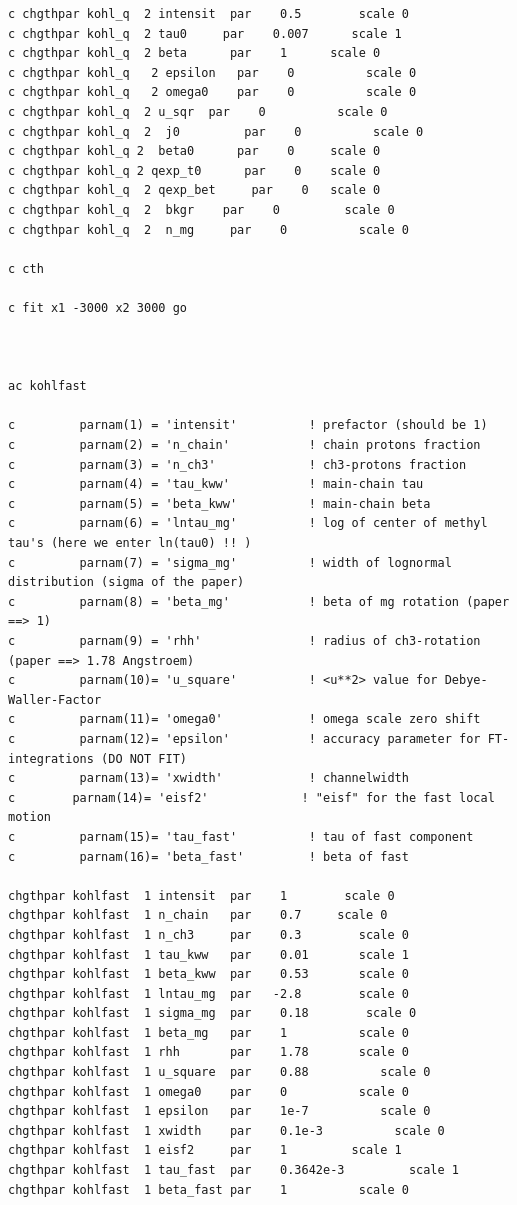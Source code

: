 \documentclass[11pt,fleqn]{book} %
\begin{document}
\begin{verbatim}
c chgthpar kohl_q  2 intensit  par    0.5        scale 0  
c chgthpar kohl_q  2 tau0     par    0.007      scale 1
c chgthpar kohl_q  2 beta      par    1 	 scale 0
c chgthpar kohl_q   2 epsilon   par    0          scale 0
c chgthpar kohl_q   2 omega0    par    0          scale 0
c chgthpar kohl_q  2 u_sqr  par    0          scale 0
c chgthpar kohl_q  2  j0         par    0          scale 0
c chgthpar kohl_q 2  beta0      par    0 	 scale 0
c chgthpar kohl_q 2 qexp_t0      par    0 	 scale 0
c chgthpar kohl_q  2 qexp_bet     par    0 	 scale 0
c chgthpar kohl_q  2  bkgr    par    0         scale 0
c chgthpar kohl_q  2  n_mg     par    0          scale 0

c cth

c fit x1 -3000 x2 3000 go



ac kohlfast

c         parnam(1) = 'intensit'          ! prefactor (should be 1)
c         parnam(2) = 'n_chain'           ! chain protons fraction
c         parnam(3) = 'n_ch3'             ! ch3-protons fraction
c         parnam(4) = 'tau_kww'           ! main-chain tau
c         parnam(5) = 'beta_kww'          ! main-chain beta
c         parnam(6) = 'lntau_mg'          ! log of center of methyl tau's (here we enter ln(tau0) !! )
c         parnam(7) = 'sigma_mg'          ! width of lognormal distribution (sigma of the paper)
c         parnam(8) = 'beta_mg'           ! beta of mg rotation (paper ==> 1)
c         parnam(9) = 'rhh'               ! radius of ch3-rotation (paper ==> 1.78 Angstroem)
c         parnam(10)= 'u_square'          ! <u**2> value for Debye-Waller-Factor
c         parnam(11)= 'omega0'            ! omega scale zero shift
c         parnam(12)= 'epsilon'           ! accuracy parameter for FT-integrations (DO NOT FIT)
c         parnam(13)= 'xwidth'            ! channelwidth
c        parnam(14)= 'eisf2'             ! "eisf" for the fast local motion
c         parnam(15)= 'tau_fast'          ! tau of fast component
c         parnam(16)= 'beta_fast'         ! beta of fast 

chgthpar kohlfast  1 intensit  par    1        scale 0      
chgthpar kohlfast  1 n_chain   par    0.7     scale 0
chgthpar kohlfast  1 n_ch3     par    0.3        scale 0
chgthpar kohlfast  1 tau_kww   par    0.01       scale 1 
chgthpar kohlfast  1 beta_kww  par    0.53 	     scale 0
chgthpar kohlfast  1 lntau_mg  par   -2.8	     scale 0
chgthpar kohlfast  1 sigma_mg  par    0.18        scale 0
chgthpar kohlfast  1 beta_mg   par    1 	     scale 0
chgthpar kohlfast  1 rhh       par    1.78 	     scale 0
chgthpar kohlfast  1 u_square  par    0.88          scale 0
chgthpar kohlfast  1 omega0    par    0          scale 0
chgthpar kohlfast  1 epsilon   par    1e-7          scale 0
chgthpar kohlfast  1 xwidth    par    0.1e-3          scale 0
chgthpar kohlfast  1 eisf2     par    1         scale 1
chgthpar kohlfast  1 tau_fast  par    0.3642e-3         scale 1
chgthpar kohlfast  1 beta_fast par    1          scale 0


\end{verbatim}
\end{document}
